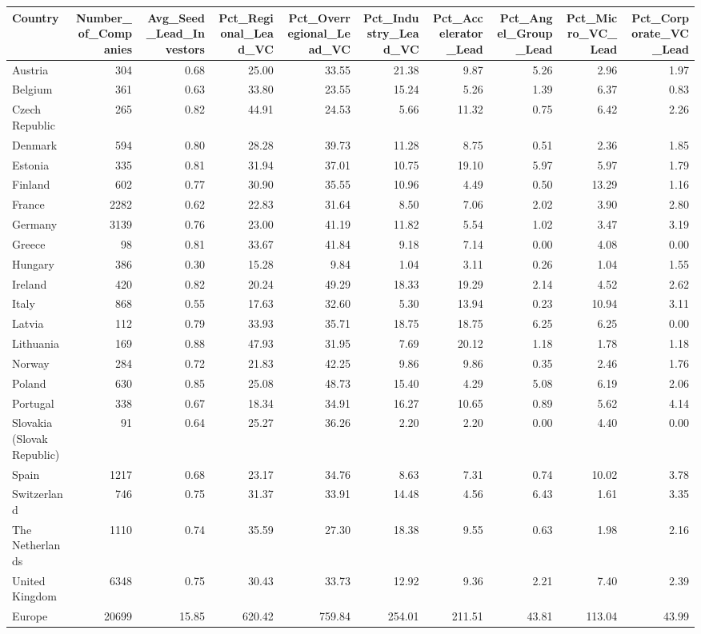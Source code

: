 \begin{tabular}{lrrrrrrrrr}
  \toprule
Country & Number_of_Companies & Avg_Seed_Lead_Investors & Pct_Regional_Lead_VC & Pct_Overregional_Lead_VC & Pct_Industry_Lead_VC & Pct_Accelerator_Lead & Pct_Angel_Group_Lead & Pct_Micro_VC_Lead & Pct_Corporate_VC_Lead \\ 
  \midrule
Austria & 304 & 0.68 & 25.00 & 33.55 & 21.38 & 9.87 & 5.26 & 2.96 & 1.97 \\ 
  Belgium & 361 & 0.63 & 33.80 & 23.55 & 15.24 & 5.26 & 1.39 & 6.37 & 0.83 \\ 
  Czech Republic & 265 & 0.82 & 44.91 & 24.53 & 5.66 & 11.32 & 0.75 & 6.42 & 2.26 \\ 
  Denmark & 594 & 0.80 & 28.28 & 39.73 & 11.28 & 8.75 & 0.51 & 2.36 & 1.85 \\ 
  Estonia & 335 & 0.81 & 31.94 & 37.01 & 10.75 & 19.10 & 5.97 & 5.97 & 1.79 \\ 
  Finland & 602 & 0.77 & 30.90 & 35.55 & 10.96 & 4.49 & 0.50 & 13.29 & 1.16 \\ 
  France & 2282 & 0.62 & 22.83 & 31.64 & 8.50 & 7.06 & 2.02 & 3.90 & 2.80 \\ 
  Germany & 3139 & 0.76 & 23.00 & 41.19 & 11.82 & 5.54 & 1.02 & 3.47 & 3.19 \\ 
  Greece &  98 & 0.81 & 33.67 & 41.84 & 9.18 & 7.14 & 0.00 & 4.08 & 0.00 \\ 
  Hungary & 386 & 0.30 & 15.28 & 9.84 & 1.04 & 3.11 & 0.26 & 1.04 & 1.55 \\ 
  Ireland & 420 & 0.82 & 20.24 & 49.29 & 18.33 & 19.29 & 2.14 & 4.52 & 2.62 \\ 
  Italy & 868 & 0.55 & 17.63 & 32.60 & 5.30 & 13.94 & 0.23 & 10.94 & 3.11 \\ 
  Latvia & 112 & 0.79 & 33.93 & 35.71 & 18.75 & 18.75 & 6.25 & 6.25 & 0.00 \\ 
  Lithuania & 169 & 0.88 & 47.93 & 31.95 & 7.69 & 20.12 & 1.18 & 1.78 & 1.18 \\ 
  Norway & 284 & 0.72 & 21.83 & 42.25 & 9.86 & 9.86 & 0.35 & 2.46 & 1.76 \\ 
  Poland & 630 & 0.85 & 25.08 & 48.73 & 15.40 & 4.29 & 5.08 & 6.19 & 2.06 \\ 
  Portugal & 338 & 0.67 & 18.34 & 34.91 & 16.27 & 10.65 & 0.89 & 5.62 & 4.14 \\ 
  Slovakia (Slovak Republic) &  91 & 0.64 & 25.27 & 36.26 & 2.20 & 2.20 & 0.00 & 4.40 & 0.00 \\ 
  Spain & 1217 & 0.68 & 23.17 & 34.76 & 8.63 & 7.31 & 0.74 & 10.02 & 3.78 \\ 
  Switzerland & 746 & 0.75 & 31.37 & 33.91 & 14.48 & 4.56 & 6.43 & 1.61 & 3.35 \\ 
  The Netherlands & 1110 & 0.74 & 35.59 & 27.30 & 18.38 & 9.55 & 0.63 & 1.98 & 2.16 \\ 
  United Kingdom & 6348 & 0.75 & 30.43 & 33.73 & 12.92 & 9.36 & 2.21 & 7.40 & 2.39 \\ 
  Europe & 20699 & 15.85 & 620.42 & 759.84 & 254.01 & 211.51 & 43.81 & 113.04 & 43.99 \\ 
   \bottomrule
\end{tabular}
